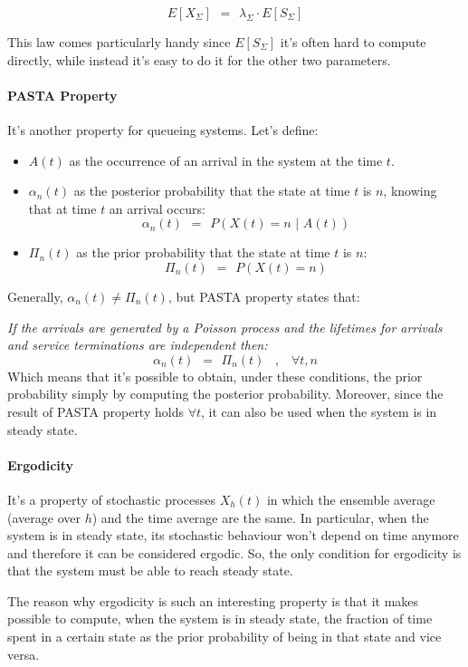 \documentclass[12pt,a4paper]{article}
\begin{document}
\bigskip \noindent
\begin{Large}
$$
E[X_{\Sigma}]\hspace{5pt}=\hspace{5pt}\lambda_{\Sigma}\cdot E[S_{\Sigma}]
$$
\end{Large}

\bigskip \noindent
This law comes particularly handy since $E[S_{\Sigma}]$ it's often hard to compute directly, while instead it's easy to do it for the other two parameters.
\paragraph{PASTA Property}
It's another property for queueing systems. Let's define:
\begin{itemize}
\item $A(t)$ as the occurrence of an arrival in the system at the time $t$.
\item $\alpha_n(t)$ as the posterior probability that the state at time $t$ is $n$, knowing that at time $t$ an arrival occurs:
$$
\alpha_n(t)
\hspace{5pt}=\hspace{5pt}
P(X(t)=n \hspace{4pt} | \hspace{4pt} A(t))
$$
\item $\Pi_n(t)$ as the prior probability that the state at time $t$ is $n$:
$$
\Pi_n(t)
\hspace{5pt}=\hspace{5pt}
P(X(t)=n)
$$
\end{itemize}
Generally, $\alpha_n(t)\neq \Pi_n(t)$, but PASTA property states that:

\bigskip\noindent
\emph{If the arrivals are generated by a Poisson process and the lifetimes for arrivals and service terminations are independent then:}
$$
\alpha_n(t) \hspace{5pt}=\hspace{5pt} \Pi_n(t) \hspace{10pt},\hspace{10pt} \forall t,n
$$
Which means that it's possible to obtain, under these conditions, the prior probability simply by computing the posterior probability. Moreover, since the result of PASTA property holds $\forall t$, it can also be used when the system is in steady state.
\newpage

\paragraph{Ergodicity}
It's a property of stochastic processes $X_h(t)$ in which the ensemble average (average over $h$) and the time average are the same. In particular, when the system is in steady state, its stochastic behaviour won't depend on time anymore and therefore it can be considered ergodic. So, the only condition for ergodicity is that the system must be able to reach steady state.

\bigskip \noindent
The reason why ergodicity is such an interesting property is that it makes possible to compute, when the system is in steady state, the fraction of time spent in a certain state as the prior probability of being in that state and vice versa.
\end{document}
